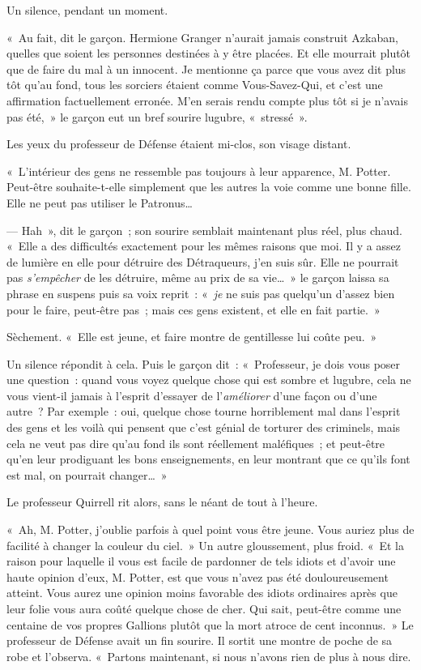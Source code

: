 Un silence, pendant un moment.

«~Au fait, dit le garçon. Hermione Granger n'aurait jamais construit Azkaban, quelles que soient les personnes destinées à y être placées. Et elle mourrait plutôt que de faire du mal à un innocent. Je mentionne ça parce que vous avez dit plus tôt qu'au fond, tous les sorciers étaient comme Vous-Savez-Qui, et c'est une affirmation factuellement erronée. M'en serais rendu compte plus tôt si je n'avais pas été,~» le garçon eut un bref sourire lugubre, «~stressé~».

Les yeux du professeur de Défense étaient mi-clos, son visage distant.

«~L'intérieur des gens ne ressemble pas toujours à leur apparence, M. Potter. Peut-être souhaite-t-elle simplement que les autres la voie comme une bonne fille. Elle ne peut pas utiliser le Patronus…

--- Hah~», dit le garçon~; son sourire semblait maintenant plus réel, plus chaud. «~Elle a des difficultés exactement pour les mêmes raisons que moi. Il y a assez de lumière en elle pour détruire des Détraqueurs, j'en suis sûr. Elle ne pourrait pas \emph{s'empêcher} de les détruire, même au prix de sa vie…~» le garçon laissa sa phrase en suspens puis sa voix reprit~: «~\emph{je} ne suis pas quelqu'un d'assez bien pour le faire, peut-être pas~; mais ces gens existent, et elle en fait partie.~»

Sèchement. «~Elle est jeune, et faire montre de gentillesse lui coûte peu.~»

Un silence répondit à cela. Puis le garçon dit~: «~Professeur, je dois vous poser une question~: quand vous voyez quelque chose qui est sombre et lugubre, cela ne vous vient-il jamais à l'esprit d'essayer de l'\emph{améliorer} d'une façon ou d'une autre~? Par exemple~: oui, quelque chose tourne horriblement mal dans l'esprit des gens et les voilà qui pensent que c'est génial de torturer des criminels, mais cela ne veut pas dire qu'au fond ils sont réellement maléfiques~; et peut-être qu'en leur prodiguant les bons enseignements, en leur montrant que ce qu'ils font est mal, on pourrait changer…~»

Le professeur Quirrell rit alors, sans le néant de tout à l'heure.

«~Ah, M. Potter, j'oublie parfois à quel point vous être jeune. Vous auriez plus de facilité à changer la couleur du ciel.~» Un autre gloussement, plus froid. «~Et la raison pour laquelle il vous est facile de pardonner de tels idiots et d'avoir une haute opinion d'eux, M. Potter, est que vous n'avez pas été douloureusement atteint. Vous aurez une opinion moins favorable des idiots ordinaires après que leur folie vous aura coûté quelque chose de cher. Qui sait, peut-être comme une centaine de vos propres Gallions plutôt que la mort atroce de cent inconnus.~» Le professeur de Défense avait un fin sourire. Il sortit une montre de poche de sa robe et l'observa. «~Partons maintenant, si nous n'avons rien de plus à nous dire.

